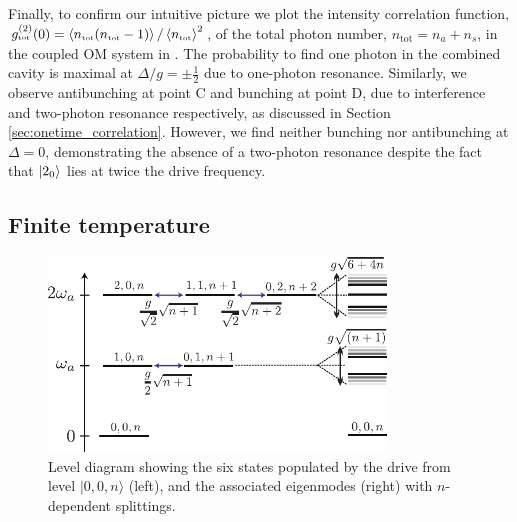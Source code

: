 Finally, to confirm our intuitive picture we plot the
intensity correlation function, 
$g^{(2)}_{\mbox{\tiny tot}}(0) =
\left< n_{\mbox{\tiny tot}}(n_{\mbox{\tiny tot}}-1) \right>/\left< n_{\mbox{\tiny tot}} \right>^2$,
of the total photon number, $n_{\text{tot}} = n_a +
n_s$,
in the coupled OM system in
. 
The probability to find one photon in the combined
cavity is maximal at $\Delta/g=\pm \frac{1}{2}$ 
due to one-photon resonance.
Similarly, we  
observe antibunching at point C
and bunching at point D,
due  to interference and two-photon resonance
respectively,
as discussed 
in Section \ref{sec:onetime_correlation}.
However, we find neither bunching nor antibunching
at $\Delta = 0$, 
demonstrating the absence of a two-photon resonance
despite the fact that $| 2_0 \rangle$ lies at twice the
drive frequency.




 


\subsection{Finite temperature}

\begin{figure}
\centering
  \includegraphics[width=0.8\textwidth]{./figs_Komar2013/fig4a.pdf}
  \caption{
  \label{fig:thermal_g2_a}
  Level diagram showing the
  six states populated by the drive from level $|0,0,n\rangle$ (left), 
  and the associated
  eigenmodes (right) with $n$-dependent splittings.
}
\end{figure} 

